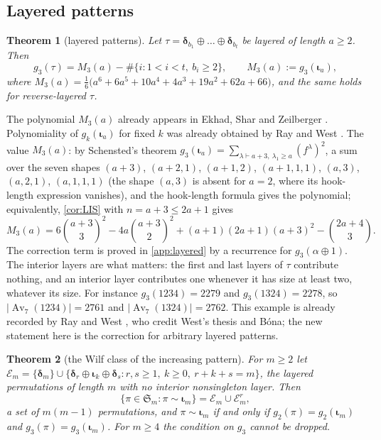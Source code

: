 \documentclass[11pt,reqno]{amsart}
\theoremstyle{plain}
\newtheorem{theorem}{Theorem}[section]
\theoremstyle{definition}
\theoremstyle{remark}
\newcommand{\Av}{\operatorname{Av}}
\let\greekiota\iota
\renewcommand{\iota}{\boldsymbol{\greekiota}}
\newcommand{\dd}{\boldsymbol{\delta}}
\newcommand{\Sym}{\mathfrak{S}}
\begin{document}
\subsection{Layered patterns}

\begin{theorem}[layered patterns]\label{thm:layered}
Let $\tau=\dd_{b_1}\oplus\dots\oplus\dd_{b_t}$ be layered of length $a\ge2$. Then
\begin{equation}\label{eq:layered}
g_3(\tau)=M_3(a)-\#\{i:1<i<t,\ b_i\ge2\},\qquad M_3(a):=g_3(\iota_a),
\end{equation}
where $M_3(a)=\tfrac16\bigl(a^6+6a^5+10a^4+4a^3+19a^2+62a+66\bigr)$, and the same holds for reverse-layered $\tau$.
\end{theorem}

The polynomial $M_3(a)$ already appears in
Ekhad, Shar and Zeilberger \cite[p.~2]{ESZ2015}.
Polynomiality of $g_k(\iota_a)$ for fixed $k$ was already obtained by
Ray and West \cite[Prop.~9.6, p.~87]{RayWest2003}. The value $M_3(a)$:
by Schensted's theorem $g_3(\iota_a)=\sum_{\lambda\vdash a+3,\ \lambda_1\ge a}(f^\lambda)^2$, a sum over the seven shapes $(a+3)$, $(a+2,1)$, $(a+1,2)$, $(a+1,1,1)$, $(a,3)$, $(a,2,1)$, $(a,1,1,1)$ (the shape $(a,3)$ is absent for $a=2$, where its hook-length expression vanishes), and the hook-length formula gives the polynomial; equivalently, \cref{cor:LIS} with $n=a+3\le2a+1$ gives
\begin{equation}\label{eq:M3}
M_3(a)=6\binom{a+3}3^2-4a\binom{a+3}2^2+(a+1)(2a+1)(a+3)^2-\binom{2a+4}3 .
\end{equation}
The correction term is proved in \cref{app:layered} by a recurrence for $g_3(\alpha\oplus1)$. The interior layers are what matters: the first and last layers of $\tau$ contribute nothing, and an interior layer contributes one whenever it has size at least two, whatever its size. For instance $g_3(1234)=2279$ and $g_3(1324)=2278$, so $|\Av_7(1234)|=2761$ and $|\Av_7(1324)|=2762$.
This example is already recorded by Ray and West
\cite[p.~88]{RayWest2003}, who credit West's thesis and B\'ona;
the new statement here is the correction for arbitrary layered patterns.

\begin{theorem}[the Wilf class of the increasing pattern]\label{thm:monoclass}
For $m\ge2$ let $\mathcal E_m=\{\dd_m\}\cup\{\dd_r\oplus\iota_k\oplus\dd_s: r,s\ge1,\ k\ge0,\ r+k+s=m\}$, the layered permutations of length $m$ with no interior nonsingleton layer. Then
\[
\{\pi\in\Sym_m:\pi\sim\iota_m\}=\mathcal E_m\cup\mathcal E_m^{r},
\]
a set of $m(m-1)$ permutations, and $\pi\sim\iota_m$ if and only if $g_2(\pi)=g_2(\iota_m)$ and $g_3(\pi)=g_3(\iota_m)$. For $m\ge4$ the condition on $g_3$ cannot be dropped.
\end{theorem}
\end{document}
